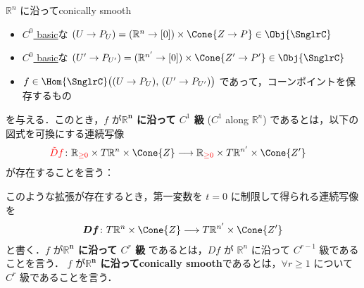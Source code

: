 \documentclass[TQFT_main]{subfiles}
\begin{document}
\begin{mydef}[label=def:c-smooth-along]{$\mathbb{R}^n$ に沿ってconically smooth}
    \begin{itemize}
        \item \hyperref[def:C0-basic]{$C^0$ basic}な $(U \to P_{U}) = (\mathbb{R}^{n} \to [0]) \times \Cone{Z \to P} \in \Obj{\SnglrC}$
        \item \hyperref[def:C0-basic]{$C^0$ basic}な $(U' \to P_{U'}) = (\mathbb{R}^{n'} \to [0]) \times \Cone{Z' \to P'} \in \Obj{\SnglrC}$
        \item $f \in \Hom{\SnglrC} \bigl( (U \to P_{U}),\, (U' \to P_{U'})  \bigr)$ であって，コーンポイントを保存するもの
    \end{itemize}
    を与える．このとき，$f$ が\textbf{$\bm{\mathbb{R}^n}$ に沿って $C^1$ 級} ($C^1$ along $\mathbb{R}^n$) であるとは，以下の図式を可換にする連続写像
    \begin{align}
        \textcolor{red}{\tilde{D}f} \colon \mathbb{R}_{\textcolor{red}{\ge 0}} \times T \mathbb{R}^n \times \Cone{Z} &\lto \mathbb{R}_{\textcolor{red}{\ge 0}} \times T \mathbb{R}^{n'} \times \Cone{Z'}
    \end{align}
    が存在することを言う：
    \begin{center}
    \end{center}
    \tcblower
    このような拡張が存在するとき，第一変数を $t=0$ に制限して得られる連続写像を
    \begin{align}
        \bm{Df} \colon T \mathbb{R}^n \times \Cone{Z} \lto T \mathbb{R}^{n'} \times \Cone{Z'}
    \end{align}
    と書く．$f$ が\textbf{$\bm{\mathbb{R}^n}$ に沿って $C^r$ 級} であるとは，$Df$ が $\mathbb{R}^n$ に沿って $C^{r-1}$ 級であることを言う．
    $f$ が\textbf{$\bm{\mathbb{R}^n}$ に沿ってconically smooth}であるとは，$\forall r \ge 1$ について $C^r$ 級であることを言う．
\end{mydef}
\end{document}
